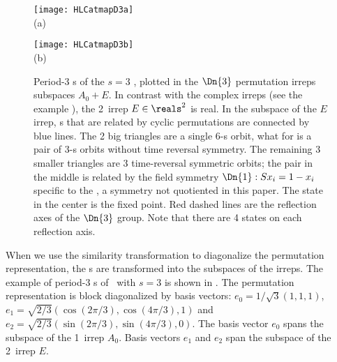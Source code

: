 \begin{figure}
  \centering
              \begin{minipage}[c]{0.4\textwidth}\begin{center}
\texttt{[image: HLCatmapD3a]}\\(a)
            \end{center}\end{minipage}
            \begin{minipage}[c]{0.4\textwidth}\begin{center}
\texttt{[image: HLCatmapD3b]}\\(b)
            \end{center}\end{minipage}
  \caption{\label{fig:HLCatmapD3}
Period-3 {\lattstate}s of the $s=3$ \templatt, plotted in the $\Dn{3}$
permutation irreps subspaces $A_0+E$. In contrast with the
\Cn{\cl{}} complex irreps (see the  example
), the 2\dmn\ irrep $E\in\reals^2$ is real.
In the subspace of the $E$ irrep,
{\lattstate}s that are related by cyclic permutations are connected by blue lines.
The 2 big triangles are a single  6-{\lattstate}s orbit, what for
 is a pair of 3-{\lattstate}s orbits without time reversal symmetry.
The remaining 3 smaller triangles are 3 time-reversal symmetric orbits;
the pair in the middle is related by the field symmetry
 $\Dn{1}: S\ssp_i = 1-\ssp_i$ specific to
the \templatt, a symmetry not quotiented in this paper. The state in
the center is the fixed point.
Red dashed lines are the reflection axes of the $\Dn{3}$ group.
Note that there are 4 states
on each reflection axis.
}
\end{figure}

When we use the similarity transformation to diagonalize the permutation
representation, the {\lattstate}s are transformed into the subspaces of
the irreps. The example of period-3 {\lattstate}s of \templatt\ with
$s=3$ is shown in . The permutation representation
is block diagonalized by basis vectors: $e_0=1/\sqrt{3}(1,1,1)$,
$e_1=\sqrt{2/3}(\cos(2\pi/3),\cos(4\pi/3),1)$ and
$e_2=\sqrt{2/3}(\sin(2\pi/3),\sin(4\pi/3),0)$. The basis vector $e_0$
spans the subspace of the 1\dmn\ irrep $A_0$. Basis vectors $e_1$ and
$e_2$ span the subspace of the 2\dmn\ irrep $E$.

